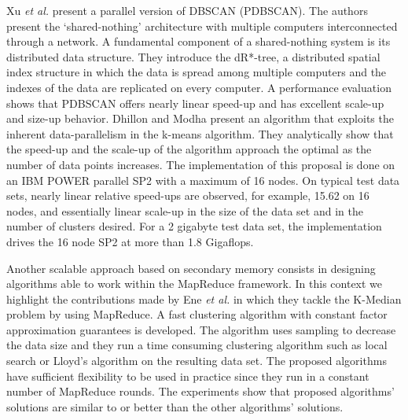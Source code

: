 \documentclass[preprint,12pt,authoryear,review]{elsarticle}
\begin{document}
Xu \textit{et al.} \cite{XJK99} present a parallel version of DBSCAN (PDBSCAN). The authors present the ‘shared-nothing’ architecture with multiple computers interconnected through a network. A fundamental component of a shared-nothing system is its distributed data structure. They introduce the dR*-tree, a distributed spatial index structure in which the data is spread among multiple computers and the indexes of the data are replicated on every computer. A performance evaluation shows that PDBSCAN offers nearly linear speed-up and has excellent scale-up and size-up behavior. Dhillon and Modha  \cite{DM99} present an algorithm that exploits the inherent data-parallelism in the k-means algorithm. They analytically show that the speed-up and the scale-up of the algorithm approach the optimal as the number of data points increases. The implementation of this proposal is done on an IBM POWER parallel SP2 with a maximum of 16 nodes. On typical test data sets, nearly linear relative speed-ups are observed, for example, 15.62 on 16 nodes, and essentially linear scale-up in the size of the data set and in the number of clusters desired. For a 2 gigabyte test data set, the implementation drives the 16 node SP2 at more than 1.8 Gigaflops.

Another scalable approach based on secondary memory consists in designing algorithms able to work  within the MapReduce framework. %
In this context we highlight the contributions made %
by Ene \textit{et al.} \cite{EIM11} in which they tackle the K-Median problem by using MapReduce.
A fast clustering algorithm with constant factor approximation guarantees is developed. The algorithm uses sampling to decrease the data size and they run a time consuming clustering algorithm such as local search or Lloyd's algorithm on the resulting data set. The proposed algorithms have sufficient flexibility to be used in practice since they run in a constant number of MapReduce rounds. The experiments show that proposed algorithms' solutions are similar to or better than the other algorithms' solutions.
\end{document}
